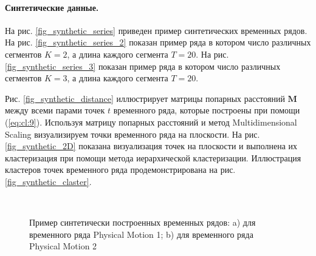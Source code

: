\paragraph{Синтетические данные.}


На рис. \ref{fig_synthetic_series} приведен пример синтетических временных рядов. 
На рис. \ref{fig_synthetic_series_2} показан пример ряда в котором число различных сегментов $K = 2$, а длина каждого сегмента $T = 20$. 
На рис. \ref{fig_synthetic_series_3} показан пример ряда в котором число различных сегментов $K = 3$, а длина каждого сегмента $T = 20$. 

Рис. \ref{fig_synthetic_distance} иллюстрирует матрицы попарных расстояний $\textbf{M}$ между всеми парами точек $t$ временного ряда, которые построены при помощи (\ref{eq:cl:9}). 
Используя матрицу попарных расстояний и метод Multidimensional Scaling \cite{Borg2005} визуализируем точки временного ряда на плоскости. 
На рис. \ref{fig_synthetic_2D} показана визуализация точек на плоскости и выполнена их кластеризация при помощи метода иерархической кластеризации. 
Иллюстрация кластеров точек временного ряда продемонстрирована на рис. \ref{fig_synthetic_claster}.

\begin{figure}[h!t]\center
{}
\\
\caption{Пример синтетически построенных временных рядов: a) для временного ряда Physical Motion 1; b) для временного ряда Physical Motion 2}
\label{fig_real_series}
\end{figure}

